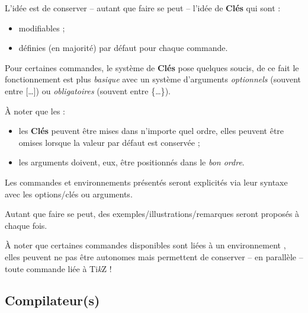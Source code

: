 \documentclass[a4paper,french,11pt]{article}
\providecommand\tikzlogo{Ti\textit{k}Z}
\let\TikZ\tikzlogo
\newcommand\ctex[1]{\tcbox[vignettelatex]{#1}}
\newcommand\Cle[1]{{\bfseries\sffamily\textlangle #1\textrangle}}
\begin{document}
\begin{tipblock}
L'idée est de conserver -- autant que faire se peut -- l'idée de \Cle{Clés} qui sont :
%
\begin{itemize}
	\item modifiables ;
	\item définies (en majorité) par défaut pour chaque commande.
\end{itemize}

Pour certaines commandes, le système de \Cle{Clés} pose quelques soucis, de ce fait le fonctionnement est plus \textit{basique} avec un système d'\textsf{arguments} \textit{optionnels} (souvent entre \textsf{[\ldots]}) ou \textit{obligatoires} (souvent entre \textsf{\{\ldots\}}).

\smallskip

À noter que les :
%
\begin{itemize}
	\item les \Cle{Clés} peuvent être mises dans n'importe quel ordre, elles peuvent être omises lorsque la valeur par défaut est conservée ;
	\item les \textsf{arguments} doivent, eux, être positionnés dans le \textit{bon ordre}.
\end{itemize}
\vspace*{-\baselineskip}\leavevmode
\end{tipblock}

\begin{noteblock}
Les \textsf{commandes} et \textsf{environnements} présentés seront explicités via leur \textsf{syntaxe} avec les \textsf{options/clés} ou \textsf{arguments}.

Autant que faire se peut, des exemples/illustrations/remarques seront proposés à chaque fois.
\end{noteblock}

\begin{noteblock}
À noter que certaines commandes disponibles sont liées à un environnement \ctex{tikzpicture}, elles peuvent ne pas être autonomes mais permettent de conserver -- en parallèle -- toute commande liée à \TikZ{} !
\end{noteblock}

\subsection{Compilateur(s)}
\end{document}
